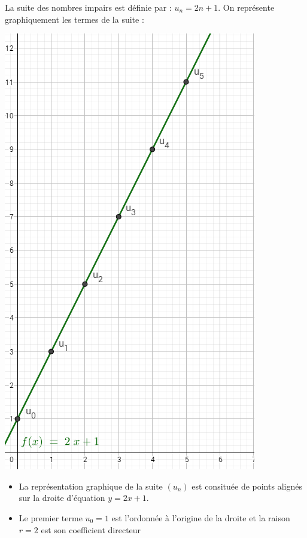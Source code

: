 \documentclass[12pt,a4paper]{article}
\date{}
\title{}
\begin{document}

%
%
%
%
%
%
%
%
%



\begin{myex}
	La suite des nombres impairs est définie par : $u_{n} = 2n +1$.
	On représente graphiquement les termes de la suite :
	
	\begin{multicols}{2}
		\includegraphics[scale=0.45]{img/arith}
		
		\begin{itemize}
			\item La représentation graphique de la suite $(u_n)$ est consituée de points alignés sur la droite d'équation $y=2x+1$.
			\item Le premier terme $u_0=1$ est l'ordonnée à l'origine de la droite et la raison $r=2$ est son coefficient directeur
		\end{itemize}
		
	\end{multicols}
	
\end{myex}
\end{document}

